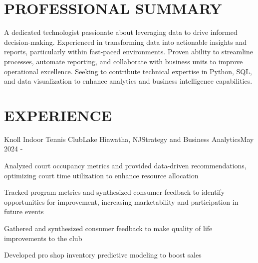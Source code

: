 \documentclass[pdfauthor={Michael Tran},pdftitle={Michael Tran}]{resume}
\begin{document}

\separator

\section{PROFESSIONAL SUMMARY}

A dedicated technologist passionate about leveraging data to drive informed decision-making. Experienced in transforming data into actionable insights and reports, particularly within fast-paced environments. Proven ability to streamline processes, automate reporting, and collaborate with business units to improve operational excellence. Seeking to contribute technical expertise in Python, SQL, and data visualization to enhance analytics and business intelligence capabilities.

\separator

\section{EXPERIENCE}

\begin{experience}{Knoll Indoor Tennis Club}{Lake Hiawatha, NJ}{Strategy and Business Analytics}{May 2024 -}
    \item Analyzed court occupancy metrics and provided data-driven recommendations, optimizing court time utilization to enhance resource allocation
    \item Tracked program metrics and synthesized consumer feedback to identify opportunities for improvement, increasing marketability and participation in future events
    \item Gathered and synthesized consumer feedback to make quality of life improvements to the club
    \item Developed pro shop inventory predictive modeling to boost sales
\end{experience}
\end{document}
